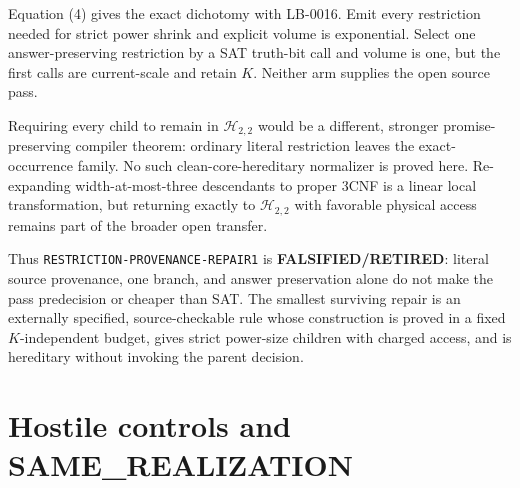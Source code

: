 \documentclass[11pt]{article}
\newcommand{\Htwo}{\mathcal H_{2,2}}
\newcommand{\RETIRED}{\textbf{FALSIFIED/RETIRED}}
\begin{document}
Equation (4) gives the exact dichotomy with LB-0016.  Emit every restriction
needed for strict power shrink and explicit volume is exponential.  Select
one answer-preserving restriction by a SAT truth-bit call and volume is one,
but the first calls are current-scale and retain $K$.  Neither arm supplies
the open source pass.

Requiring every child to remain in $\Htwo$ would be a different, stronger
promise-preserving compiler theorem: ordinary literal restriction leaves the
exact-occurrence family.  No such clean-core-hereditary normalizer is proved
here.  Re-expanding width-at-most-three descendants to proper 3CNF is a
linear local transformation, but returning exactly to $\Htwo$ with favorable
physical access remains part of the broader open transfer.

Thus \texttt{RESTRICTION-PROVENANCE-REPAIR1} is \RETIRED{}: literal source
provenance, one branch, and answer preservation alone do not make the pass
predecision or cheaper than SAT.  The smallest surviving repair is an
externally specified, source-checkable rule whose construction is proved in a
fixed $K$-independent budget, gives strict power-size children with charged
access, and is hereditary without invoking the parent decision.

\section{Hostile controls and SAME\_REALIZATION}
\end{document}
